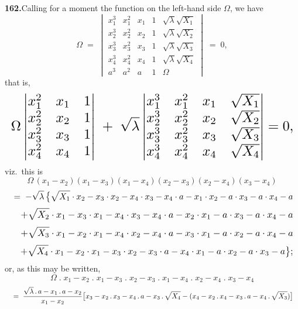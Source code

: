 \documentclass[11pt]{article}
\begin{document}
\medskip
\textbf{162.}\quad Calling for a moment the function on the left-hand side $\Omega$,
we have
\[
\Omega
\;=\;
\begin{vmatrix}
 x_{1}^{3} & x_{1}^{2} & x_{1} & 1 & \sqrt{\lambda}\sqrt{X_{1}}\\[2pt]
 x_{2}^{3} & x_{2}^{2} & x_{2} & 1 & \sqrt{\lambda}\sqrt{X_{2}}\\[2pt]
 x_{3}^{3} & x_{3}^{2} & x_{3} & 1 & \sqrt{\lambda}\sqrt{X_{3}}\\[2pt]
 x_{4}^{3} & x_{4}^{2} & x_{4} & 1 & \sqrt{\lambda}\sqrt{X_{4}}\\[2pt]
 a^{3} & a^{2} & a & 1 & \Omega
\end{vmatrix}
\;=\;0,
\]
that is,
\[
\resizebox{\textwidth}{!}{$\displaystyle
\Omega
\begin{vmatrix} x_{1}^{2} & x_{1} & 1\\ x_{2}^{2} & x_{2} & 1\\ x_{3}^{2} & x_{3} & 1\\ x_{4}^{2} & x_{4} & 1\end{vmatrix}
\;+\;\sqrt{\lambda}
\begin{vmatrix} x_{1}^{3} & x_{1}^{2} & x_{1} & \sqrt{X_{1}}\\ x_{2}^{3} & x_{2}^{2} & x_{2} & \sqrt{X_{2}}\\
                x_{3}^{3} & x_{3}^{2} & x_{3} & \sqrt{X_{3}}\\ x_{4}^{3} & x_{4}^{2} & x_{4} & \sqrt{X_{4}}\end{vmatrix}=0,
$}
\]
viz.\ this is
\[
\Omega\,(x_{1}-x_{2})(x_{1}-x_{3})(x_{1}-x_{4})(x_{2}-x_{3})(x_{2}-x_{4})(x_{3}-x_{4})
\]
\[
\resizebox{\textwidth}{!}{$\displaystyle
\;=\;-\sqrt{\lambda}\,\bigl\{
 \sqrt{X_{1}}\cdot x_{2}-x_{3}\cdot x_{2}-x_{4}\cdot x_{3}-x_{4}\cdot a-x_{1}\cdot x_{2}-a\cdot x_{3}-a\cdot x_{4}-a
$}
\]
\[
\resizebox{\textwidth}{!}{$\displaystyle
\quad+\sqrt{X_{2}}\cdot x_{1}-x_{3}\cdot x_{1}-x_{4}\cdot x_{3}-x_{4}\cdot a-x_{2}\cdot x_{1}-a\cdot x_{3}-a\cdot x_{4}-a
$}
\]
\[
\resizebox{\textwidth}{!}{$\displaystyle
\quad+\sqrt{X_{3}}\cdot x_{1}-x_{2}\cdot x_{1}-x_{4}\cdot x_{2}-x_{4}\cdot a-x_{3}\cdot x_{1}-a\cdot x_{2}-a\cdot x_{4}-a
$}
\]
\[
\resizebox{\textwidth}{!}{$\displaystyle
\quad+\sqrt{X_{4}}\cdot x_{1}-x_{2}\cdot x_{1}-x_{3}\cdot x_{2}-x_{3}\cdot a-x_{4}\cdot x_{1}-a\cdot x_{2}-a\cdot x_{3}-a\bigr\};
$}
\]
or, as this may be written,
\[
\Omega \;.\; x_{1}-x_{2}\;.\; x_{1}-x_{3}\;.\; x_{2}-x_{3}\;.\; x_{1}-x_{4}\;.\; x_{2}-x_{4}\;.\; x_{3}-x_{4}
\]
\[
\resizebox{\textwidth}{!}{$\displaystyle
\;=\;\frac{\sqrt{\lambda}\,.\,a-x_{1}\,.\,a-x_{2}}{x_{1}-x_{2}}\bigl[x_{3}-x_{2}\,.\,x_{3}-x_{4}\,.\,a-x_{3}\,.\,\sqrt{X_{4}}-(x_{4}-x_{2}\,.\,x_{4}-x_{3}\,.\,a-x_{4}\,.\,\sqrt{X_{3}})\bigr]
$}
\]
\end{document}
